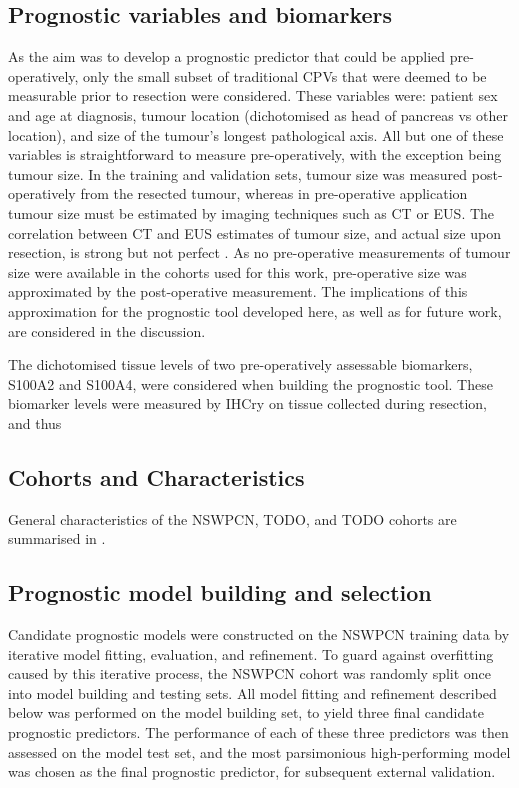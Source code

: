 \documentclass[dissertation.tex]{subfiles}
\begin{document}
\subsection{Prognostic variables and biomarkers}
As the aim was to develop a prognostic predictor that could be applied pre-operatively, only the small subset of traditional \glspl{CPV} that were deemed to be measurable prior to resection were considered.  These variables were: patient sex and age at diagnosis, tumour location (dichotomised as head of pancreas vs other location), and size of the tumour's longest pathological axis.  All but one of these variables is straightforward to measure pre-operatively, with the exception being tumour size.  In the training and validation sets, tumour size was measured post-operatively from the resected tumour, whereas in pre-operative application tumour size must be estimated by imaging techniques such as \gls{CT} or \gls{EUS}.  The correlation between \gls{CT} and \gls{EUS} estimates of tumour size, and actual size upon resection, is strong but not perfect \cite{Arvold2011}.  As no pre-operative measurements of tumour size were available in the cohorts used for this work, pre-operative size was approximated by the post-operative measurement.  The implications of this approximation for the prognostic tool developed here, as well as for future work, are considered in the discussion.

The dichotomised tissue levels of two pre-operatively assessable biomarkers, S100A2 and S100A4, were considered when building the prognostic tool.  These biomarker levels were measured by \gls{IHCry} on tissue collected during resection, and thus 

\subsection{Cohorts and Characteristics}
General characteristics of the \gls{NSWPCN}, TODO, and TODO cohorts are summarised in .

\subsection{Prognostic model building and selection}
Candidate prognostic models were constructed on the \gls{NSWPCN} training data by iterative model fitting, evaluation, and refinement.  To guard against overfitting caused by this iterative process, the \gls{NSWPCN} cohort was randomly split once into model building and testing sets.  All model fitting and refinement described below was performed on the model building set, to yield three final candidate prognostic predictors.  The performance of each of these three predictors was then assessed on the model test set, and the most parsimonious high-performing model was chosen as the final prognostic predictor, for subsequent external validation.
\end{document}
